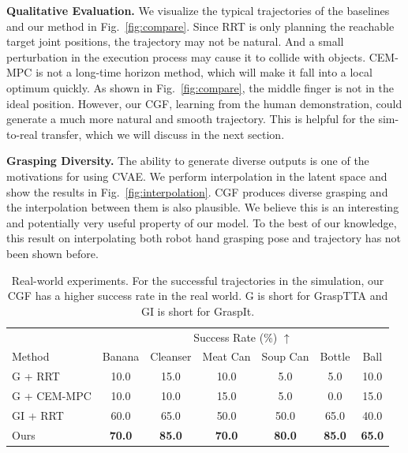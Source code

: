 \documentclass[letterpaper, 10 pt, journal, twoside]{IEEEtran}
\newcommand{\tablestyle}[2]{\setlength{\tabcolsep}{#1}\renewcommand{\arraystretch}{#2}\centering\footnotesize}
\begin{document}
\textbf{Qualitative Evaluation.} We visualize the typical trajectories of the baselines and our method in Fig.~\ref{fig:compare}. Since RRT is only planning the reachable target joint positions, the trajectory may not be natural. And a small perturbation in the execution process may cause it to collide with objects. CEM-MPC is not a long-time
horizon method, which will make it fall into a local optimum quickly. As shown in Fig.~\ref{fig:compare}, the middle finger is not in the ideal position. However, our CGF, learning from the human demonstration, could generate a much more natural and smooth trajectory. This is helpful for the sim-to-real transfer, which we will discuss in the next section.

\textbf{Grasping Diversity.} The ability to generate diverse outputs is one of the motivations for using CVAE. We perform interpolation in the latent space and show the results in Fig.~\ref{fig:interpolation}. CGF produces diverse grasping and the interpolation between them is also plausible. We believe this is an interesting and potentially very useful property of our model. To the best of our knowledge, this result on interpolating both robot hand grasping pose and trajectory has not been shown before.

\begin{table}[t]
\tiny
\centering
\tablestyle{1.5pt}{1.05}
\begin{tabular}{l|cccccc}
     & \multicolumn{6}{c}{Success Rate (\%) $\uparrow$} \\
    Method & Banana & Cleanser & Meat Can & Soup Can & Bottle & Ball  \\
    \shline
    G + RRT & 10.0 & 15.0 & 10.0 & 5.0 & 5.0 & 10.0 \\
    G + CEM-MPC & 10.0 & 10.0 & 15.0 & 5.0 & 0.0  & 15.0 \\
    GI + RRT & 60.0 & 65.0 & 50.0 & 50.0 & 65.0 & 40.0 \\
    Ours & \textbf{70.0} & \textbf{85.0} & \textbf{70.0} & \textbf{80.0} & \textbf{85.0} & \textbf{65.0} \\
\end{tabular}
\vspace{-0.05in}
\caption{\small
Real-world experiments. For the successful trajectories in the simulation, our CGF has a higher success rate in the real world. G is short for GraspTTA and GI is short for GraspIt.}
\vspace{-0.15in}
\label{tab:real}
\end{table}
\end{document}
